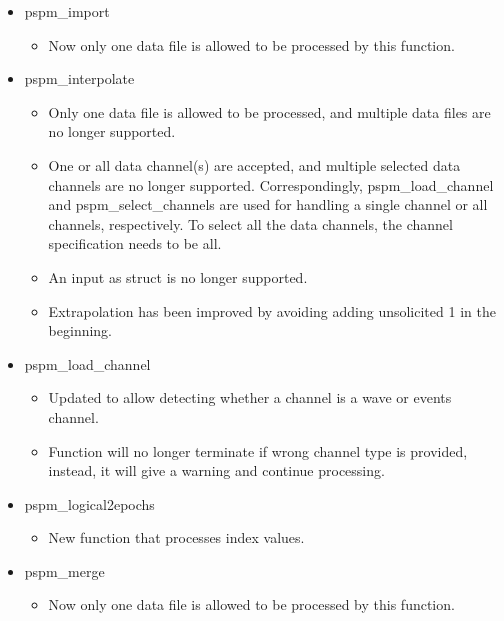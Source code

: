 \documentclass[english]{article}
\numberwithin{equation}{section}
\numberwithin{figure}{section}
\begin{document}
\begin{itemize}
\item pspm\_import

\begin{itemize}
\item Now only one data file is allowed to be processed by this function.
\end{itemize}

\item pspm\_interpolate

\begin{itemize}
\item Only one data file is allowed to be processed, and multiple data files are no longer supported.

\item One or all data channel(s) are accepted, and multiple selected data channels are no longer supported. Correspondingly, pspm\_load\_channel and pspm\_select\_channels are used for handling a single channel or all channels, respectively. To select all the data channels, the channel specification needs to be all.

\item An input as struct is no longer supported.

\item Extrapolation has been improved by avoiding adding unsolicited 1 in the beginning.
\end{itemize}

\item pspm\_load\_channel

\begin{itemize}
\item Updated to allow detecting whether a channel is a wave or events channel.

\item Function will no longer terminate if wrong channel type is provided, instead, it will give a warning and continue processing.
\end{itemize}

\item pspm\_logical2epochs

\begin{itemize}
\item New function that processes index values.
\end{itemize}

\item pspm\_merge

\begin{itemize}
\item Now only one data file is allowed to be processed by this function.
\end{itemize}


\end{itemize}
\end{document}
